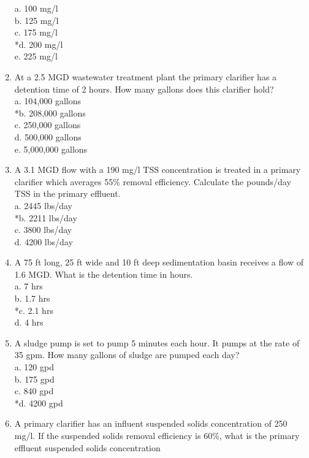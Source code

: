 \begin{enumerate}
a. 100 mg/l \\
b. 125 mg/l \\
c. 175 mg/l \\
*d. 200 mg/l \\
e. 225 mg/l \\


\item  At a 2.5 MGD wastewater treatment plant the primary clarifier has a detention time of 2 hours. How many gallons does this clarifier hold? \\

a. 104,000 gallons \\
*b. 208,000 gallons \\
c. 250,000 gallons \\
d. 500,000 gallons \\
e. 5,000,000 gallons \\


\item  A 3.1 MGD flow  with a 190 mg/l TSS concentration is treated in a primary clarifier which averages 55\% removal efficiency.  Calculate the pounds/day TSS in the primary effluent. \\

a. 2445 lbs/day \\
*b. 2211 lbs/day \\
c. 3800 lbs/day \\
d. 4200 lbs/day \\


\item  A 75 ft long, 25 ft wide and 10 ft deep sedimentation basin receives a flow of 1.6 MGD.  What is the detention time in hours. \\

a. 7 hrs \\
b. 1.7 hrs \\
*c. 2.1 hrs \\
d. 4 hrs \\


\item  A sludge pump is set to pump 5 minutes each hour. It pumps at the rate of 35 gpm. How many gallons of sludge are pumped each day? \\

a. 120 gpd \\
b. 175 gpd \\
c. 840 gpd \\
*d. 4200 gpd \\


\item  A primary clarifier has an influent suspended solids concentration of 250 mg/l. If the suspended solids  removal efficiency is 60\%, what is the primary effluent suspended solids concentration \\


\end{enumerate}
